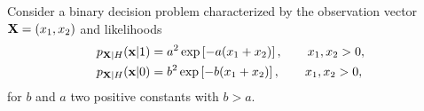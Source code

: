 \begin{solution}
\end{solution}

\else
\question[25] %

Consider a binary decision problem characterized by the observation vector ${\bf X} = (x_1,x_2)$ and likelihoods
\begin{align}
p_{{\bf X}|H}({\bf x}|1) &= a^2 \exp\left[-a (x_1+x_2)\right], \qquad x_1, x_2 > 0, 
\nonumber\\
p_{{\bf X}|H}({\bf x}|0) &= b^2 \exp\left[-b (x_1+x_2)\right], \qquad x_1, x_2 > 0,
\end{align}
for $b$ and $a$ two positive constants with $b>a$.


